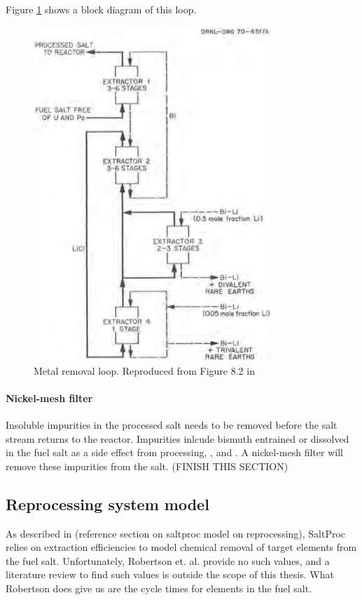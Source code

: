 Figure \ref{fig:metal-removal} shows a block diagram of this loop. 

\begin{figure}[htpb]
    \centering
    \includegraphics[width=0.8\textwidth]{figs/ch4/metal_removal_loop.png}
    \caption{Metal removal loop. Reproduced from Figure 8.2 in \cite{robertson_conceptual_1971}}
    \label{fig:metal-removal}
\end{figure}

\paragraph{Nickel-mesh filter}
Insoluble impurities in the processed salt needs to be removed before the salt stream returns to the reactor. Impurities inlcude bismuth entrained or dissolved in the fuel salt as a side effect from processing, , and . A nickel-mesh filter will remove these impurities from the salt. (FINISH THIS SECTION)


\subsection{Reprocessing system model}
As described in (reference section on saltproc model on reprocessing), SaltProc relies on extraction efficiencies to model chemical removal of target elements from the fuel salt. Unfortunately, Robertson et. al. \cite{robertson_conceptual_1971} provide no such values, and a literature review to find such values is outside the scope of this thesis. What Robertson does give us are the cycle times for elements in the fuel salt.

